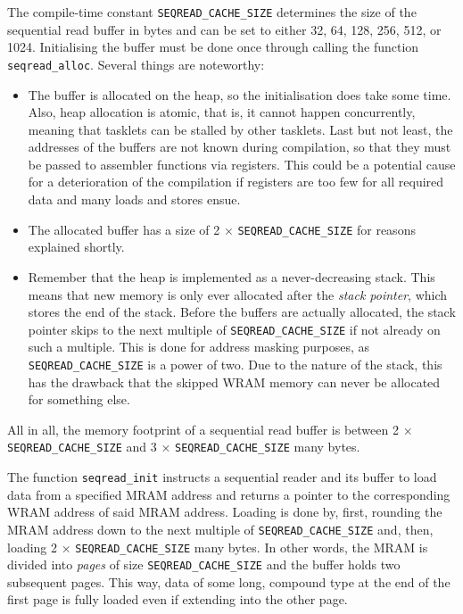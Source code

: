 The compile-time constant \lstinline|SEQREAD_CACHE_SIZE| determines the size of the sequential read buffer in bytes and can be set to either 32, 64, 128, 256, 512, or 1024.
Initialising the buffer must be done once through calling the function \lstinline|seqread_alloc|.
Several things are noteworthy:
\begin{itemize}
	\item
	The buffer is allocated on the heap, so the initialisation does take some time.
	Also, heap allocation is atomic, that is, it cannot happen concurrently, meaning that tasklets can be stalled by other tasklets.
	Last but not least, the addresses of the buffers are not known during compilation, so that they must be passed to assembler functions via registers.
	This could be a potential cause for a deterioration of the compilation if registers are too few for all required data and many loads and stores ensue.

	\item
	The allocated buffer has a size of 2 × \lstinline|SEQREAD_CACHE_SIZE| for reasons explained shortly.

	\item
	Remember that the heap is implemented as a never-decreasing stack.
	This means that new memory is only ever allocated after the \emph{stack pointer}, which stores the end of the stack.
	Before the buffers are actually allocated, the stack pointer skips to the next multiple of \lstinline|SEQREAD_CACHE_SIZE| if not already on such a multiple.
	This is done for address masking purposes, as \lstinline|SEQREAD_CACHE_SIZE| is a power of two.
	Due to the nature of the stack, this has the drawback that the skipped WRAM memory can never be allocated for something else.
\end{itemize}
All in all, the memory footprint of a sequential read buffer is between 2 × \lstinline|SEQREAD_CACHE_SIZE| and 3 × \lstinline|SEQREAD_CACHE_SIZE| many bytes.

The function \lstinline|seqread_init| instructs a sequential reader and its buffer to load data from a specified MRAM address and returns a pointer to the corresponding WRAM address of said MRAM address.
Loading is done by, first, rounding the MRAM address down to the next multiple of \lstinline|SEQREAD_CACHE_SIZE| and, then, loading 2 × \lstinline|SEQREAD_CACHE_SIZE| many bytes.
In other words, the MRAM is divided into \emph{pages} of size \lstinline|SEQREAD_CACHE_SIZE| and the buffer holds two subsequent pages.
This way, data of some long, compound type at the end of the first page is fully loaded even if extending into the other page.

